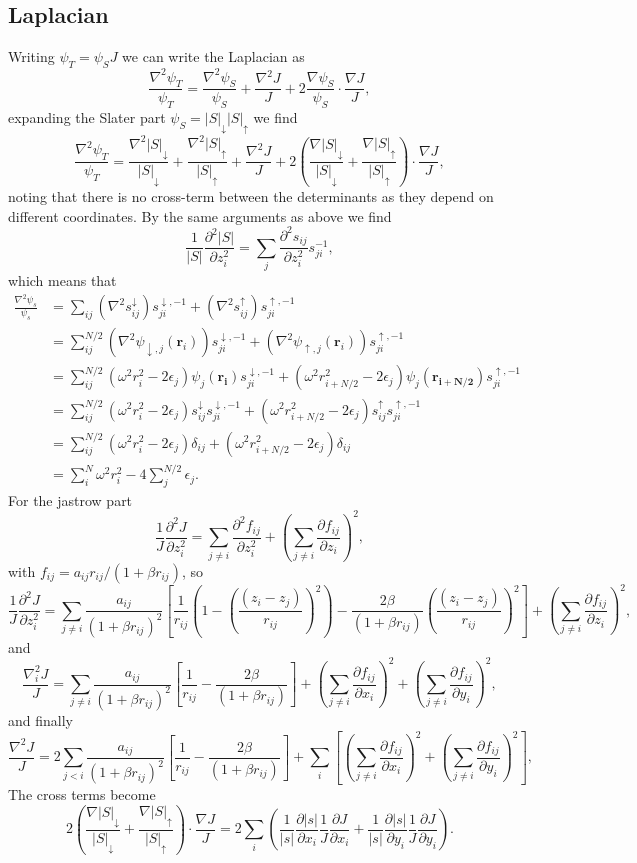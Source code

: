\documentclass[a4paper,norsk,10pt]{article}
\newcommand{\bb}[1]{\boldsymbol{#1}}
\newcommand{\p}{\partial}
\newcommand{\pddt}[2]{\frac{\p #1}{\p #2}}
\newcommand{\pndt}[3]{\frac{\p^{#3} #1}{\p #2^{#3}}}
\newcommand{\uar}{\uparrow}
\newcommand{\dar}{\downarrow}
\newcommand{\f}{\frac}
\begin{document}
\subsection{Laplacian}\label{applapn}

Writing $\psi_T = \psi_SJ$ we can write the Laplacian as
\[
\f{\nabla^2\psi_T}{\psi_T} = \f{\nabla^2\psi_S}{\psi_S} + \f{\nabla^2J}{J} + 2\f{\nabla\psi_S}{\psi_S}\cdot\f{\nabla J}{J},
\]
expanding the Slater part $\psi_S =|S|_{\dar}|S|_{\uar}$ we find
\[
\f{\nabla^2\psi_T}{\psi_T} = \f{\nabla^2|S|_{\dar}}{|S|_{\dar}} + \f{\nabla^2|S|_{\uar}}{|S|_{\uar}} + \f{\nabla^2J}{J}
+ 2\left(\f{\nabla |S|_{\dar}}{|S|_{\dar}} + \f{\nabla |S|_{\uar}}{|S|_{\uar}}\right)\cdot\f{\nabla J}{J},
\]
noting that there is no cross-term between the determinants as they depend on different coordinates.
By the same arguments as above we find
\[
\f{1}{|S|}\pndt{|S|}{z_i}{2} = \sum_j \pndt{s_{ij}}{z_i}{2}s^{-1}_{ji},
\]
which means that
\begin{align*}
  \f{\nabla^2\psi_s}{\psi_s} &= \sum_{ij}(\nabla^2s^\dar_{ij})s^{\dar,-1}_{ji} + (\nabla^2s^\uar_{ij})s^{\uar,-1}_{ji}\\
  &= \sum_{ij}^{N/2}(\nabla^2\psi_{\dar,j}(\bb{r}_i))s^{\dar,-1}_{ji} + (\nabla^2\psi_{\uar,j}(\bb{r}_i))s^{\uar,-1}_{ji} \\
  &= \sum_{ij}^{N/2}(\omega^2r^2_i-2\epsilon_{j})\psi_j(\bb{r_i})s^{\dar,-1}_{ji} + (\omega^2r^2_{i + N/2}-2\epsilon_{j})\psi_j(\bb{r_{i+N/2}})s^{\uar,-1}_{ji}\\
  &= \sum_{ij}^{N/2}(\omega^2r^2_i-2\epsilon_j)s^{\dar}_{ij}s^{\dar,-1}_{ji} + (\omega^2r^2_{i +N/2}-2\epsilon_j)s^{\uar}_{ij}s^{\uar,-1}_{ji}\\
  &= \sum_{ij}^{N/2}(\omega^2r^2_i-2\epsilon_j)\delta_{ij} + (\omega^2r^2_{i + N/2}-2\epsilon_j)\delta_{ij}\\
  &= \sum_{i}^{N}\omega^2r^2_i -4\sum_j^{N/2}\epsilon_j. 
\end{align*}
For the jastrow part
\[
\f{1}{J}\pndt{J}{z_i}{2} = \sum_{j\neq i}\pndt{f_{ij}}{z_i}{2} + \left(\sum_{j\neq i}\pddt{f_{ij}}{z_i}\right)^2,
\]
with $f_{ij} = a_{ij}r_{ij}/(1+\beta r_{ij})$, so
\[
\f{1}{J}\pndt{J}{z_i}{2} = \sum_{j \neq i}\f{a_{ij}}{(1+\beta r_{ij})^2}\left[\f{1}{r_{ij}}\left(1 -\left(\f{(z_i-z_j)}{r_{ij}}\right)^2\right) -\f{2\beta}{(1+\beta r_{ij})}\left(\f{(z_i-z_j)}{r_{ij}}\right)^2\right] + \left(\sum_{j\neq i}\pddt{f_{ij}}{z_i}\right)^2,
\]
and
\[
\f{\nabla^2_iJ}{J} = \sum_{j \neq i}\f{a_{ij}}{(1+\beta r_{ij})^2}\left[\f{1}{r_{ij}} -\f{2\beta}{(1+\beta r_{ij})}\right]
+ \left(\sum_{j\neq i}\pddt{f_{ij}}{x_i}\right)^2 + \left(\sum_{j\neq i}\pddt{f_{ij}}{y_i}\right)^2,
\]
and finally
\[
\f{\nabla^2J}{J} =2 \sum_{j < i}\f{a_{ij}}{(1+\beta r_{ij})^2}\left[\f{1}{r_{ij}} -\f{2\beta}{(1+\beta r_{ij})}\right]
+ \sum_i \left[\left(\sum_{j\neq i}\pddt{f_{ij}}{x_i}\right)^2 + \left(\sum_{j\neq i}\pddt{f_{ij}}{y_i}\right)^2\right],
\]
The cross terms become
\[
 2\left(\f{\nabla |S|_{\dar}}{|S|_{\dar}} + \f{\nabla |S|_{\uar}}{|S|_{\uar}}\right)\cdot\f{\nabla J}{J} = 2\sum_i\left(\f{1}{|s|}\pddt{|s|}{x_i}\f{1}{J}\pddt{J}{x_i} + \f{1}{|s|}\pddt{|s|}{y_i}\f{1}{J}\pddt{J}{y_i}\right). 
\]
\end{document}
